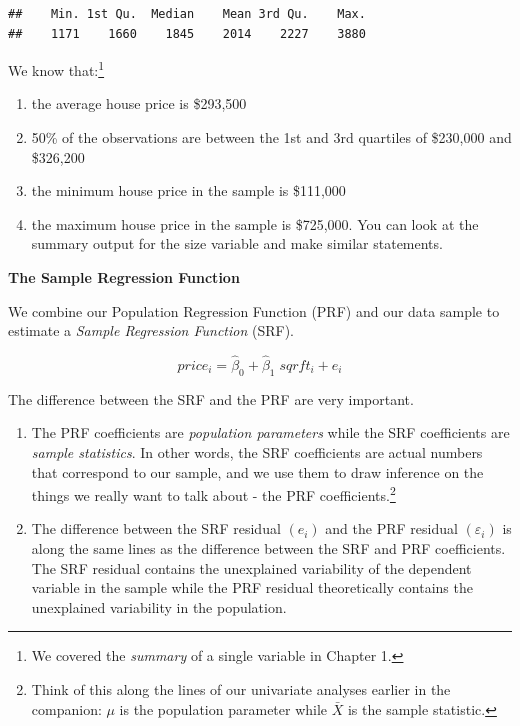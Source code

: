 \documentclass[
]{book}
\begin{document}
\begin{verbatim}
##    Min. 1st Qu.  Median    Mean 3rd Qu.    Max. 
##    1171    1660    1845    2014    2227    3880
\end{verbatim}

We know that:\footnote{We covered the \emph{summary} of a single variable in Chapter 1.}

\begin{enumerate}
\def\labelenumi{\arabic{enumi}.}
\item
  the average house price is \$293,500
\item
  50\% of the observations are between the 1st and 3rd quartiles of \$230,000 and \$326,200
\item
  the minimum house price in the sample is \$111,000
\item
  the maximum house price in the sample is \$725,000. You can look at the summary output for the size variable and make similar statements.
\end{enumerate}

\textbf{The Sample Regression Function}

We combine our Population Regression Function (PRF) and our data sample to estimate a \emph{Sample Regression Function} (SRF).

\[price_i=\hat{\beta}_0+\hat{\beta}_1 \; sqrft_i+e_i\]

The difference between the SRF and the PRF are very important.

\begin{enumerate}
\def\labelenumi{\arabic{enumi}.}
\item
  The PRF coefficients are \emph{population parameters} while the SRF coefficients are \emph{sample statistics}. In other words, the SRF coefficients are actual numbers that correspond to our sample, and we use them to draw inference on the things we really want to talk about - the PRF coefficients.\footnote{Think of this along the lines of our univariate analyses earlier in the companion: \(\mu\) is the population parameter while \(\bar{X}\) is the sample statistic.}
\item
  The difference between the SRF residual \((e_i)\) and the PRF residual \((\varepsilon_i)\) is along the same lines as the difference between the SRF and PRF coefficients. The SRF residual contains the unexplained variability of the dependent variable in the sample while the PRF residual theoretically contains the unexplained variability in the population.
\end{enumerate}
\end{document}
